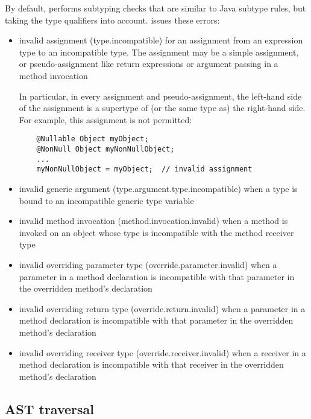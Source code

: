 By default,  performs subtyping checks that are
similar to Java subtype rules, but taking the type qualifiers into account.
 issues these errors:

\begin{itemize}

\item invalid assignment (type.incompatible) for an assignment from
  an expression type to an incompatible type.  The assignment may be a
  simple assignment, or pseudo-assignment like return expressions or
  argument passing in a method invocation

  In particular, in every assignment and pseudo-assignment, the
  left-hand side of the assignment is a supertype of (or the same type
  as) the right-hand side.  For example, this assignment is not
  permitted:

  \begin{Verbatim}
    @Nullable Object myObject;
    @NonNull Object myNonNullObject;
    ...
    myNonNullObject = myObject;  // invalid assignment
  \end{Verbatim}

\item invalid generic argument (type.argument.type.incompatible) when a type
  is bound to an incompatible generic type variable

\item invalid method invocation (method.invocation.invalid) when a
  method is invoked on an object whose type is incompatible with the
  method receiver type

\item invalid overriding parameter type (override.parameter.invalid)
  when a parameter in a method declaration is incompatible with that
  parameter in the overridden method's declaration

\item invalid overriding return type (override.return.invalid) when a
  parameter in a method declaration is incompatible with that
  parameter in the overridden method's declaration

\item invalid overriding receiver type (override.receiver.invalid)
  when a receiver in a method declaration is incompatible with that
  receiver in the overridden method's declaration

\end{itemize}


\subsection{AST traversal\label{ast-traversal}}

